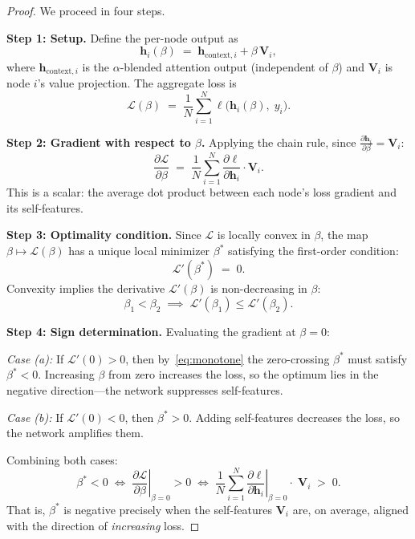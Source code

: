 \documentclass[sigconf]{acmart}
\begin{document}
\begin{proof}
We proceed in four steps.

\medskip
\noindent\textbf{Step 1: Setup.}
Define the per-node output as
\begin{equation}
\mathbf{h}_i(\beta) \;=\; \mathbf{h}_{\text{context},i} + \beta\,\mathbf{V}_i,
\end{equation}
where $\mathbf{h}_{\text{context},i}$ is the $\alpha$-blended attention output (independent of $\beta$) and $\mathbf{V}_i$ is node $i$'s value projection. The aggregate loss is
\begin{equation}
\mathcal{L}(\beta) \;=\; \frac{1}{N}\sum_{i=1}^{N} \ell\bigl(\mathbf{h}_i(\beta),\; y_i\bigr).
\end{equation}

\noindent\textbf{Step 2: Gradient with respect to $\beta$.}
Applying the chain rule, since $\frac{\partial \mathbf{h}_i}{\partial \beta} = \mathbf{V}_i$:
\begin{equation}
\frac{\partial \mathcal{L}}{\partial \beta} \;=\; \frac{1}{N}\sum_{i=1}^{N} \frac{\partial \ell}{\partial \mathbf{h}_i} \cdot \mathbf{V}_i.
\label{eq:beta_grad}
\end{equation}
This is a scalar: the average dot product between each node's loss gradient and its self-features.

\medskip
\noindent\textbf{Step 3: Optimality condition.}
Since $\mathcal{L}$ is locally convex in $\beta$, the map $\beta \mapsto \mathcal{L}(\beta)$ has a unique local minimizer $\beta^*$ satisfying the first-order condition:
\begin{equation}
\mathcal{L}'(\beta^*) \;=\; 0.
\end{equation}
Convexity implies the derivative $\mathcal{L}'(\beta)$ is non-decreasing in $\beta$:
\begin{equation}
\beta_1 < \beta_2 \;\implies\; \mathcal{L}'(\beta_1) \leq \mathcal{L}'(\beta_2).
\label{eq:monotone}
\end{equation}

\noindent\textbf{Step 4: Sign determination.}
Evaluating the gradient at $\beta = 0$:

\emph{Case (a):} If $\mathcal{L}'(0) > 0$, then by~\eqref{eq:monotone} the zero-crossing $\beta^*$ must satisfy $\beta^* < 0$. Increasing $\beta$ from zero increases the loss, so the optimum lies in the negative direction---the network suppresses self-features.

\emph{Case (b):} If $\mathcal{L}'(0) < 0$, then $\beta^* > 0$. Adding self-features decreases the loss, so the network amplifies them.

\medskip
\noindent Combining both cases:
\begin{equation}
\beta^* < 0 \;\iff\; \left.\frac{\partial \mathcal{L}}{\partial \beta}\right|_{\beta=0} > 0 \;\iff\; \frac{1}{N}\sum_{i=1}^{N} \left.\frac{\partial \ell}{\partial \mathbf{h}_i}\right|_{\beta=0} \!\!\cdot\; \mathbf{V}_i \;>\; 0.
\end{equation}
That is, $\beta^*$ is negative precisely when the self-features $\mathbf{V}_i$ are, on average, aligned with the direction of \emph{increasing} loss.
\end{proof}
\end{document}

